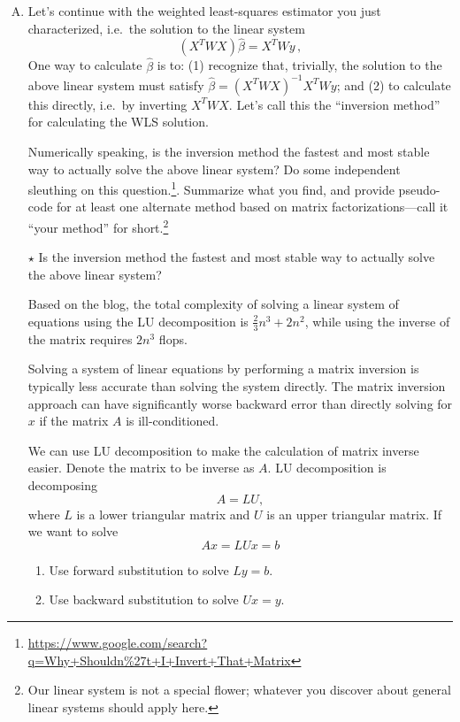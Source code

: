 \documentclass[11pt]{article}
\newcommand{\jie}{$\star$ }
\begin{document}
\begin{enumerate}[(A)]

\item Let's continue with the weighted least-squares estimator you just characterized, i.e.~the solution to the linear system
$$
(X^T W X) \hat \beta = X^T W y \, ,
$$
One way to calculate $\hat{\beta}$ is to: (1) recognize that, trivially, the solution to the above linear system must satisfy $\hat \beta = (X^T W X)^{-1} X^T W y$; and (2) to calculate this directly, i.e.~by inverting $X^T W X$.  Let's call this the ``inversion method'' for calculating the WLS solution.

Numerically speaking, is the inversion method the fastest and most stable way to actually solve the above linear system?  Do some independent sleuthing on this question.\footnote{\url{https://www.google.com/search?q=Why+Shouldn\%27t+I+Invert+That+Matrix}}.   Summarize what you find, and provide pseudo-code for at least one alternate method based on matrix factorizations---call it ``your method'' for short.\footnote{Our linear system is not a special flower; whatever you discover about general linear systems should apply here.}

\bigskip

\jie
Is the inversion method the fastest and most stable way to actually solve the above linear system?

Based on the blog, the total complexity of solving a linear system of equations using the LU decomposition is
$\frac{2}{3}n^3 + 2n^2$, while using the inverse of the matrix requires $2n^3$ flops.

Solving a system of linear equations by performing a matrix inversion is typically less accurate than solving the system directly. The matrix inversion approach can have significantly worse backward error than directly solving for $x$ if the matrix $A$ is ill-conditioned.

\smallskip
We can use LU decomposition to make the calculation of matrix inverse easier. Denote the matrix to be inverse as $A$. LU decomposition is decomposing
$$A = LU,$$
where $L$ is a lower triangular matrix and $U$ is an upper triangular matrix.
If we want to solve $$Ax = LUx =b$$
\begin{enumerate}
    \item Use forward substitution to solve $Ly = b$.
    \item Use backward substitution to solve $Ux = y$.
\end{enumerate}


\end{enumerate}
\end{document}
